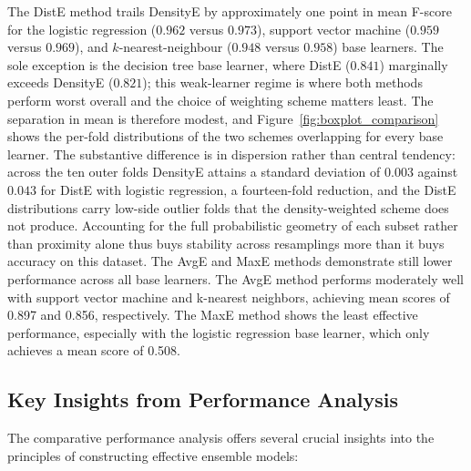 \documentclass[lettersize,journal]{IEEEtran}
\begin{document}
	The DistE method trails DensityE by approximately one point in mean F-score for the logistic
	regression ($0.962$ versus $0.973$), support vector machine ($0.959$ versus $0.969$), and
	$k$-nearest-neighbour ($0.948$ versus $0.958$) base learners. The sole exception is the decision
	tree base learner, where DistE ($0.841$) marginally exceeds DensityE ($0.821$); this weak-learner
	regime is where both methods perform worst overall and the choice of weighting scheme matters
	least. The separation in mean is therefore modest, and Figure~\ref{fig:boxplot_comparison} shows
	the per-fold distributions of the two schemes overlapping for every base learner. The substantive
	difference is in dispersion rather than central tendency: across the ten outer folds DensityE
	attains a standard deviation of $0.003$ against $0.043$ for DistE with logistic regression, a
	fourteen-fold reduction, and the DistE distributions carry low-side outlier folds that the
	density-weighted scheme does not produce. Accounting for the full probabilistic geometry of each
	subset rather than proximity alone thus buys stability across resamplings more than it buys
	accuracy on this dataset. The AvgE and MaxE methods demonstrate still lower performance across all base learners. The
	AvgE method performs moderately well with support vector machine and
	k-nearest neighbors, achieving mean scores of 0.897 and 0.856, respectively.
	The MaxE method shows the least effective performance, especially with the
	logistic regression base learner, which only achieves a mean score of 0.508.
	
	\subsection{Key Insights from Performance Analysis}
	
	The comparative performance analysis offers several crucial insights into the principles of constructing effective ensemble models:
	
\end{document}
